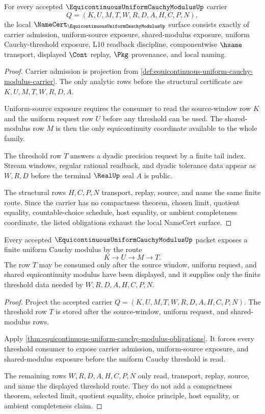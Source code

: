 \begin{theorem}
\label{thm:equicontinuous-uniform-cauchy-modulus-obligations}
For every accepted $\EquicontinuousUniformCauchyModulusUp$ carrier
$$
Q=(K,U,M,T,W,R,D,A,H,C,P,N),
$$
the local $\NameCert_{\EquicontinuousUniformCauchyModulusUp}$ surface consists exactly of carrier admission, uniform-source exposure, shared-modulus exposure, uniform Cauchy-threshold exposure, L10 readback discipline, componentwise $\hsame$ transport, displayed $\Cont$ replay, $\Pkg$ provenance, and local naming.
\end{theorem}
\begin{proof}
Carrier admission is projection from \autoref{def:equicontinuous-uniform-cauchy-modulus-carrier}. The only analytic rows before the structural certificate are $K,U,M,T,W,R,D,A$.

Uniform-source exposure requires the consumer to read the source-window row $K$ and the uniform request row $U$ before any threshold can be used. The shared-modulus row $M$ is then the only equicontinuity coordinate available to the whole family.

The threshold row $T$ answers a dyadic precision request by a finite tail index. Stream windows, regular rational readback, and dyadic tolerance data appear as $W,R,D$ before the terminal $\RealUp$ seal $A$ is public.

The structural rows $H,C,P,N$ transport, replay, source, and name the same finite route. Since the carrier has no compactness theorem, chosen limit, quotient equality, countable-choice schedule, host equality, or ambient completeness coordinate, the listed obligations exhaust the local NameCert surface.
\end{proof}

\begin{theorem}
\label{thm:equicontinuous-uniform-cauchy-modulus-extraction}
Every accepted $\EquicontinuousUniformCauchyModulusUp$ packet exposes a finite uniform Cauchy modulus by the route
$$
K\longrightarrow U\longrightarrow M\longrightarrow T .
$$
The row $T$ may be consumed only after the source window, uniform request, and shared equicontinuity modulus have been displayed, and it supplies only the finite threshold data needed by $W,R,D,A,H,C,P,N$.
\end{theorem}
\begin{proof}
Project the accepted carrier $Q=(K,U,M,T,W,R,D,A,H,C,P,N)$. The threshold row $T$ is stored after the source-window, uniform request, and shared-modulus rows.

Apply \autoref{thm:equicontinuous-uniform-cauchy-modulus-obligations}. It forces every threshold consumer to expose carrier admission, uniform-source exposure, and shared-modulus exposure before the uniform Cauchy threshold is read.

The remaining rows $W,R,D,A,H,C,P,N$ only read, transport, replay, source, and name the displayed threshold route. They do not add a compactness theorem, selected limit, quotient equality, choice principle, host equality, or ambient completeness claim.
\end{proof}


